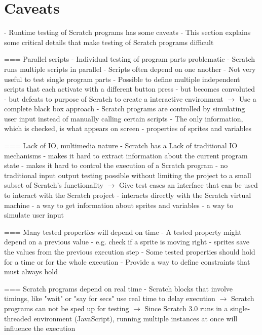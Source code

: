 \section{Caveats}
- Runtime testing of Scratch programs has some caveats
- This section explains some critical details that make testing of Scratch programs difficult

=== Parallel scripts
- Individual testing of program parts problematic
    - Scratch runs multiple scripts in parallel
        - Scripts often depend on one another
    - Not very useful to test single program parts
    - Possible to define multiple independent scripts that each activate with a different button press
        - but becomes convoluted
        - but defeats to purpose of Scratch to create a interactive environment
$\rightarrow$ Use a complete black box approach
    - Scratch programs are controlled by simulating user input instead of manually calling certain scripts
    - The only information, which is checked, is what appears on screen
        - properties of sprites and variables

=== Lack of IO, multimedia nature
- Scratch has a Lack of traditional IO mechanisms
    - makes it hard to extract information about the current program state
    - makes it hard to control the execution of a Scratch program
    - no traditional input output testing possible without limiting the project to a small subset of Scratch's functionality
$\rightarrow$ Give test cases an interface that can be used to interact with the Scratch project
    - interacts directly with the Scratch virtual machine
    - a way to get information about sprites and variables
    - a way to simulate user input

=== Many tested properties will depend on time
- A tested property might depend on a previous value
    - e.g. check if a sprite is moving right
    - sprites save the values from the previous execution step
- Some tested properties should hold for a time or for the whole execution
    - Provide a way to define constraints that must always hold

=== Scratch programs depend on real time
- Scratch blocks that involve timings, like "wait" or "say for secs" use real time to delay execution
$\rightarrow$ Scratch programs can not be sped up for testing
$\rightarrow$ Since Scratch 3.0 runs in a single-threaded environment (JavaScript), running multiple instances
              at once will influence the execution
